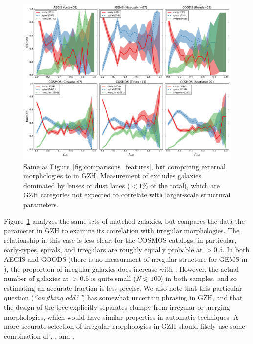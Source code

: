 \documentclass[twocolumn]{aastex6}
\begin{document}
\begin{figure}
\center
\includegraphics[width=1.0\textwidth]{figures/comparisons_odd.pdf}
\caption{Same as Figure~\ref{fig:comparisons_features}, but comparing external
morphologies to \fodd{} in GZH. Measurement of \fodd{} excludes galaxies
dominated by lenses or dust lanes ($<1\%$ of the total), which are GZH
categories not expected to correlate with larger-scale structural parameters.}
\label{fig:comparisons_odd}
\end{figure}

Figure~\ref{fig:comparisons_odd} analyzes the same sets of matched galaxies, but
compares the data the \fodd{} parameter in GZH to examine its correlation with
irregular morphologies. The relationship in this case is less clear; for the
COSMOS catalogs, in particular, early-types, spirals, and irregulars are
roughly equally probable at \fodd$>0.5$. In both AEGIS and GOODS (there is no
measurment of irregular structure for GEMS in \citealt{hau07}), the proportion
of irregular galaxies does increase with \fodd. However, the actual number of
galaxies at \fodd$>0.5$ is quite small ($N\lesssim100$) in both samples, and so
estimating an accurate fraction is less precise.  We also note that this
particular question ({\it ``anything odd?''}) has somewhat uncertain phrasing
in GZH, and that the design of the tree explicitly separates clumpy from
irregular or merging morphologies, which would have similar properties in
automatic techniques. A more accurate selection of irregular morphologies in
GZH should likely use some combination of \fbest, \fclumpy, and \fodd.
\end{document}
